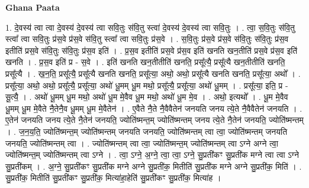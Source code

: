 \documentclass[17pt]{extarticle}
\begin{document}
\textbf{Ghana Paata } \newline

1. दे॒वस्य॑ त्वा त्वा दे॒वस्य॑ दे॒वस्य॑ त्वा सवि॒तुः स॑वि॒तु स्त्वा॑ दे॒वस्य॑ दे॒वस्य॑ त्वा सवि॒तुः । . त्वा॒ स॒वि॒तुः स॑वि॒तु स्त्वा᳚ त्वा सवि॒तुः प्र॑स॒वे प्र॑स॒वे स॑वि॒तु स्त्वा᳚ त्वा सवि॒तुः प्र॑स॒वे । . स॒वि॒तुः प्र॑स॒वे प्र॑स॒वे स॑वि॒तुः स॑वि॒तुः प्र॑स॒व इतीति॑ प्रस॒वे स॑वि॒तुः स॑वि॒तुः प्र॑स॒व इति॑ । . प्र॒स॒व इतीति॑ प्रस॒वे प्र॑स॒व इति॑ खनति खन॒तीति॑ प्रस॒वे प्र॑स॒व इति॑ खनति । . प्र॒स॒व इति॑ प्र - स॒वे । . इति॑ खनति खन॒तीतीति॑ खनति॒ प्रसू᳚त्यै॒ प्रसू᳚त्यै खन॒तीतीति॑ खनति॒ प्रसू᳚त्यै । . ख॒न॒ति॒ प्रसू᳚त्यै॒ प्रसू᳚त्यै खनति खनति॒ प्रसू᳚त्या॒ अथो॒ अथो॒ प्रसू᳚त्यै खनति खनति॒ प्रसू᳚त्या॒ अथो᳚ । . प्रसू᳚त्या॒ अथो॒ अथो॒ प्रसू᳚त्यै॒ प्रसू᳚त्या॒ अथो॑ धू॒मम् धू॒म मथो॒ प्रसू᳚त्यै॒ प्रसू᳚त्या॒ अथो॑ धू॒मम् । . प्रसू᳚त्या॒ इति॒ प्र - सू॒त्यै॒ । . अथो॑ धू॒मम् धू॒म मथो॒ अथो॑ धू॒म मे॒वैव धू॒म मथो॒ अथो॑ धू॒म मे॒व । . अथो॒ इत्यथो᳚ । . धू॒म मे॒वैव धू॒मम् धू॒म मे॒वैते नै॒तेनै॒व धू॒मम् धू॒म मे॒वैतेन॑ । . ए॒वैते नै॒ते नै॒वैवैतेन॑ जनयति जनय त्ये॒ते नै॒वैवैतेन॑ जनयति । . ए॒तेन॑ जनयति जनय त्ये॒ते नै॒तेन॑ जनयति॒ ज्योति॑ष्मन्त॒म् ज्योति॑ष्मन्तम् जनय त्ये॒ते नै॒तेन॑ जनयति॒ ज्योति॑ष्मन्तम् । . ज॒न॒य॒ति॒ ज्योति॑ष्मन्त॒म् ज्योति॑ष्मन्तम् जनयति जनयति॒ ज्योति॑ष्मन्तम् त्वा त्वा॒ ज्योति॑ष्मन्तम् जनयति जनयति॒ ज्योति॑ष्मन्तम् त्वा । . ज्योति॑ष्मन्तम् त्वा त्वा॒ ज्योति॑ष्मन्त॒म् ज्योति॑ष्मन्तम् त्वा ऽग्ने अग्ने त्वा॒ ज्योति॑ष्मन्त॒म् ज्योति॑ष्मन्तम् त्वा ऽग्ने । . त्वा॒ ऽग्ने॒ अ॒ग्ने॒ त्वा॒ त्वा॒ ऽग्ने॒ सु॒प्रती॑कꣳ सु॒प्रती॑क मग्ने त्वा त्वा ऽग्ने सु॒प्रती॑कम् । . अ॒ग्ने॒ सु॒प्रती॑कꣳ सु॒प्रती॑क मग्ने अग्ने सु॒प्रती॑क॒ मितीति॑ सु॒प्रती॑क मग्ने अग्ने सु॒प्रती॑क॒ मिति॑ । . सु॒प्रती॑क॒ मितीति॑ सु॒प्रती॑कꣳ सु॒प्रती॑क॒ मित्या॑हा॒हेति॑ सु॒प्रती॑कꣳ सु॒प्रती॑क॒ मित्या॑ह । \newline
\end{document}
